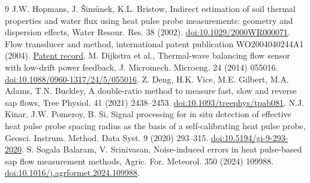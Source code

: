 \documentclass[11pt]{article}
\begin{document}
\begin{thebibliography}{9}
 J.W. Hopmans, J. \v{S}im\r{u}nek, K.L. Bristow, Indirect estimation of soil thermal properties and water flux using heat pulse probe measurements: geometry and dispersion effects, Water Resour. Res. 38 (2002). \href{https://doi.org/10.1029/2000WR000071}{doi:10.1029/2000WR000071}.
 Flow transducer and method, international patent publication WO2004040244A1 (2004). \href{https://patents.google.com/patent/WO2004040244A1/en}{Patent record}.
 M. Dijkstra et al., Thermal-wave balancing flow sensor with low-drift power feedback, J. Micromech. Microeng. 24 (2014) 055016. \href{https://doi.org/10.1088/0960-1317/24/5/055016}{doi:10.1088/0960-1317/24/5/055016}.
 Z. Deng, H.K. Vice, M.E. Gilbert, M.A. Adams, T.N. Buckley, A double-ratio method to measure fast, slow and reverse sap flows, Tree Physiol. 41 (2021) 2438--2453. \href{https://doi.org/10.1093/treephys/tpab081}{doi:10.1093/treephys/tpab081}.
 N.J. Kinar, J.W. Pomeroy, B. Si, Signal processing for in situ detection of effective heat pulse probe spacing radius as the basis of a self-calibrating heat pulse probe, Geosci. Instrum. Method. Data Syst. 9 (2020) 293--315. \href{https://doi.org/10.5194/gi-9-293-2020}{doi:10.5194/gi-9-293-2020}.
 S. Sogala Balaram, V. Srinivasan, Noise-induced errors in heat pulse-based sap flow measurement methods, Agric. For. Meteorol. 350 (2024) 109988. \href{https://doi.org/10.1016/j.agrformet.2024.109988}{doi:10.1016/j.agrformet.2024.109988}.
\end{thebibliography}
\end{document}
